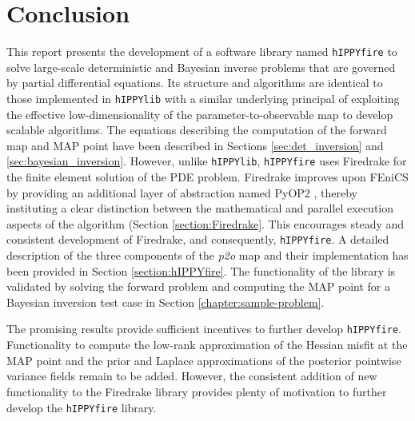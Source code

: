 \chapter{Conclusion}
\label{chapter:conclusion}

This report presents the development of a software library named \texttt{hIPPYfire} to solve large-scale deterministic and Bayesian inverse problems that are governed by partial differential equations. Its structure and algorithms are identical to those implemented in \texttt{hIPPYlib} \cite{villa2018hippylib} with a similar underlying principal of exploiting the effective low-dimensionality of the parameter-to-observable map to develop scalable algorithms. The equations describing the computation of the forward map and MAP point have been described in Sections \ref{sec:det_inversion} and \ref{sec:bayesian_inversion}. However, unlike \texttt{hIPPYlib}, \texttt{hIPPYfire} uses Firedrake \cite{rathgeber2014firedrake} for the finite element solution of the PDE problem. Firedrake improves upon FEniCS by providing an additional layer of abstraction named PyOP2 \cite{rathgeber2012pyop2}, thereby instituting a clear distinction between the mathematical and parallel execution aspects of the algorithm (Section \ref{section:Firedrake}. This encourages steady and consistent development of Firedrake, and consequently, \texttt{hIPPYfire}. A detailed description of the three components of the \textit{p2o} map and their implementation has been provided in Section \ref{section:hIPPYfire}. The functionality of the library is validated by solving the forward problem and computing the MAP point for a Bayesian inversion test case in Section \ref{chapter:sample-problem}.

The promising results provide sufficient incentives to further develop \texttt{hIPPYfire}. Functionality to compute the low-rank approximation of the Hessian misfit at the MAP point and the prior and Laplace approximations of the posterior pointwise variance fields remain to be added. However, the consistent addition of new functionality to the Firedrake library provides plenty of motivation to further develop the \texttt{hIPPYfire} library.